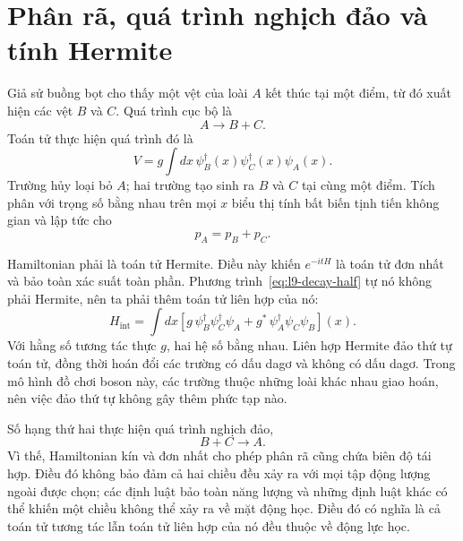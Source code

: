 \section{Phân rã, quá trình nghịch đảo và tính Hermite}

Giả sử buồng bọt cho thấy một vệt của loài \(A\) kết thúc tại một điểm, từ đó xuất hiện các vệt \(B\) và \(C\). Quá trình cục bộ là
\begin{equation}
A\longrightarrow B+C.
\end{equation}
Toán tử thực hiện quá trình đó là
\begin{equation}
V=g\int dx\,
\psi_B^\dagger(x)\psi_C^\dagger(x)\psi_A(x).
\label{eq:l9-decay-half}
\end{equation}
Trường hủy loại bỏ \(A\); hai trường tạo sinh ra \(B\) và \(C\) tại cùng một điểm. Tích phân với trọng số bằng nhau trên mọi \(x\) biểu thị tính bất biến tịnh tiến không gian và lập tức cho
\begin{equation}
p_A=p_B+p_C.
\end{equation}

Hamiltonian phải là toán tử Hermite. Điều này khiến \(e^{-itH}\) là toán tử đơn nhất và bảo toàn xác suất toàn phần. Phương trình~\eqref{eq:l9-decay-half} tự nó không phải Hermite, nên ta phải thêm toán tử liên hợp của nó:
\begin{equation}
H_{\mathrm{int}}
=\int dx\left[
g\,\psi_B^\dagger\psi_C^\dagger\psi_A
+g^*\,\psi_A^\dagger\psi_C\psi_B
\right](x).
\label{eq:l9-hermitian-vertex}
\end{equation}
Với hằng số tương tác thực \(g\), hai hệ số bằng nhau. Liên hợp Hermite đảo thứ tự toán tử, đồng thời hoán đổi các trường có dấu dagơ và không có dấu dagơ. Trong mô hình đồ chơi boson này, các trường thuộc những loài khác nhau giao hoán, nên việc đảo thứ tự không gây thêm phức tạp nào.

Số hạng thứ hai thực hiện quá trình nghịch đảo,
\begin{equation}
B+C\longrightarrow A.
\end{equation}
Vì thế, Hamiltonian kín và đơn nhất cho phép phân rã cũng chứa biên độ tái hợp. Điều đó không bảo đảm cả hai chiều đều xảy ra với mọi tập động lượng ngoài được chọn; các định luật bảo toàn năng lượng và những định luật khác có thể khiến một chiều không thể xảy ra về mặt động học. Điều đó có nghĩa là cả toán tử tương tác lẫn toán tử liên hợp của nó đều thuộc về động lực học.

\begin{classroomqa}\end{classroomqa}

